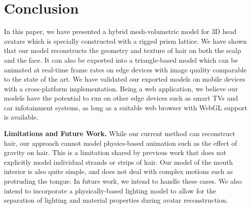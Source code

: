 
\section{Conclusion}

In this paper, we have presented a hybrid mesh-volumetric model for 3D head avatars which is specially constructed with a rigged prism lattice. We have shown that our model reconstructs the geometry and texture of hair on both the scalp and the face. It can also be exported into a triangle-based model which can be animated at real-time frame rates on edge devices with image quality comparable to the state of the art. We have validated our exported models on mobile devices with a cross-platform implementation. Being a web application, we believe our models have the potential to run on other edge devices such as smart TVs and car infotainment systems, as long as a suitable web browser with WebGL support is available.

\textbf{Limitations and Future Work.}
While our current method can reconstruct hair, our approach cannot model physics-based animation such as the effect of gravity on hair. This is a limitation shared by previous work that does not explicitly model individual strands or strips of hair. Our model of the mouth interior is also quite simple, and does not deal with complex motions such as protruding the tongue. In future work, we intend to handle these cases. We also intend to incorporate a physically-based lighting model to allow for the separation of lighting and material properties during avatar reconstruction.